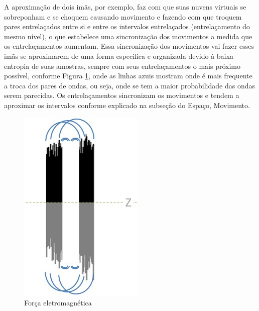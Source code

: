 A aproximação de dois imãs, por exemplo, faz com que suas nuvens virtuais se sobreponham e se choquem causando movimento e fazendo com que troquem pares entrelaçados entre si e entre os intervalos entrelaçados (entrelaçamento do mesmo nível), o que estabelece uma sincronização dos movimentos a medida que os entrelaçamentos aumentam. Essa sincronização dos movimentos vai fazer esses imãs se aproximarem de uma forma especifica e organizada devido à baixa entropia de suas amostras, sempre com seus entrelaçamentos o mais próximo possível, conforme Figura \ref{fig:consciousness_electromaagnetic_force}, onde as linhas azuis mostram onde é mais frequente a troca dos pares de ondas, ou seja, onde se tem a maior probabilidade das ondas serem parecidas. Os entrelaçamentos sincronizam os movimentos e tendem a aproximar os intervalos conforme explicado na subseção do Espaço, Movimento.
	\begin{figure}[H]
	\caption{Força eletromagnética}
	\label{fig:consciousness_electromaagnetic_force}
	\centering
	\includegraphics[scale=.9]{sections/images/consciousness_electromaagnetic_force.jpg}
	\end{figure}

